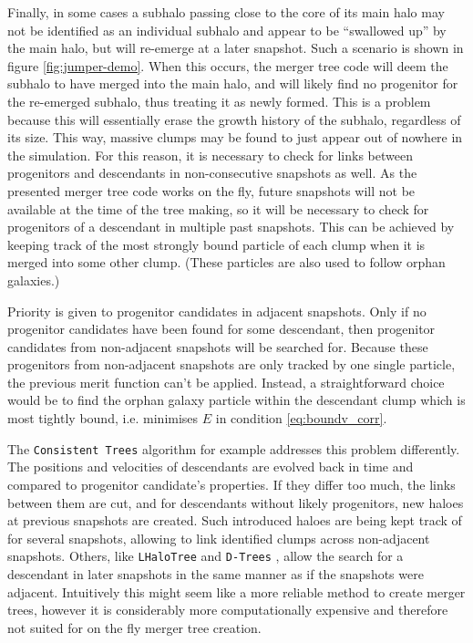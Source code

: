 Finally, in some cases a subhalo passing close to the core of its main halo may not be identified as an individual subhalo and appear to be ``swallowed up'' by the main halo, but will re-emerge at a later snapshot.
Such a scenario is shown in figure \ref{fig:jumper-demo}.
When this occurs, the merger tree code will deem the subhalo to have merged into the main halo, and will likely find no progenitor for the re-emerged subhalo, thus treating it as newly formed.
This is a problem because this will essentially erase the growth history of the subhalo, regardless of its size.
This way, massive clumps may be found to just appear out of nowhere in the simulation.
For this reason, it is necessary to check for links between progenitors and descendants in non-consecutive snapshots as well.
As the presented merger tree code works on the fly, future snapshots will not be available at the time of the tree making, so it will be necessary to check for progenitors of a descendant in multiple past snapshots.
This can be achieved by keeping track of the most strongly bound particle of each clump when it is merged into some other clump.
(These particles are also used to follow orphan galaxies.)


Priority is given to progenitor candidates in adjacent snapshots.
Only if no progenitor candidates have been found for some descendant, then progenitor candidates from non-adjacent snapshots will be searched for.
Because these progenitors from non-adjacent snapshots are only tracked by one single particle, the previous merit function can't be applied.
Instead, a straightforward choice would be to find the orphan galaxy particle within the descendant clump which is most tightly bound, i.e. minimises $E$ in condition \eqref{eq:boundv_corr}.


The \texttt{Consistent Trees} algorithm \parencite{ConsistentTrees} for example addresses this problem differently.
The positions and velocities of descendants are evolved back in time and compared to progenitor candidate's properties.
If they differ too much, the links between them are cut, and for descendants without likely progenitors, new haloes at previous snapshots are created.
Such introduced haloes are being kept track of for several snapshots, allowing to link identified clumps across non-adjacent snapshots.
Others, like \texttt{LHaloTree} \parencite{LHaloTree} and \texttt{D-Trees} \parencite{D_Trees}, allow the search for a descendant in later snapshots in the same manner as if the snapshots were adjacent.
Intuitively this might seem like a more reliable method to create merger trees, however it is considerably more computationally expensive and therefore not suited for on the fly merger tree creation.














